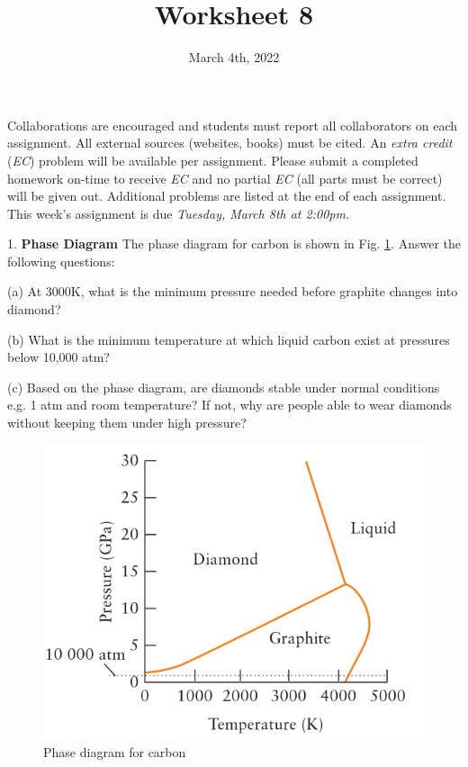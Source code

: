 \documentclass[11pt]{article}
\title{\textbf{Worksheet 8}}
\date{\vspace{-2em}March 4th, 2022}
\begin{document}
\maketitle

Collaborations are encouraged and students must report all collaborators
on each assignment. All external sources (websites, books) must be
cited. An \textit{extra credit} (\textit{EC}) problem will be available per
assignment. Please submit a completed homework on-time to receive \textit{EC}
and no partial \textit{EC} (all parts must be correct) will be given out.
Additional problems are listed at the end of each assignment. This week's
assignment is due \textit{Tuesday, March 8th at 2:00pm.}

1. \textbf{Phase Diagram} The phase diagram for carbon is shown in Fig. \ref{fig:carb}.
Answer the following questions:

(a) At 3000K, what is the minimum pressure needed before graphite changes into
diamond?

(b) What is the minimum temperature at which liquid carbon exist at pressures
below 10,000 atm?

(c) Based on the phase diagram, are diamonds stable under normal conditions e.g.
1 atm and room temperature? If not, why are people able to wear diamonds without
keeping them under high pressure?

\begin{figure}[hbpt]
  \centering
  \includegraphics[scale=0.4]{carbon.png}
  \caption{Phase diagram for carbon}
  \label{fig:carb}
\end{figure}
\end{document}
